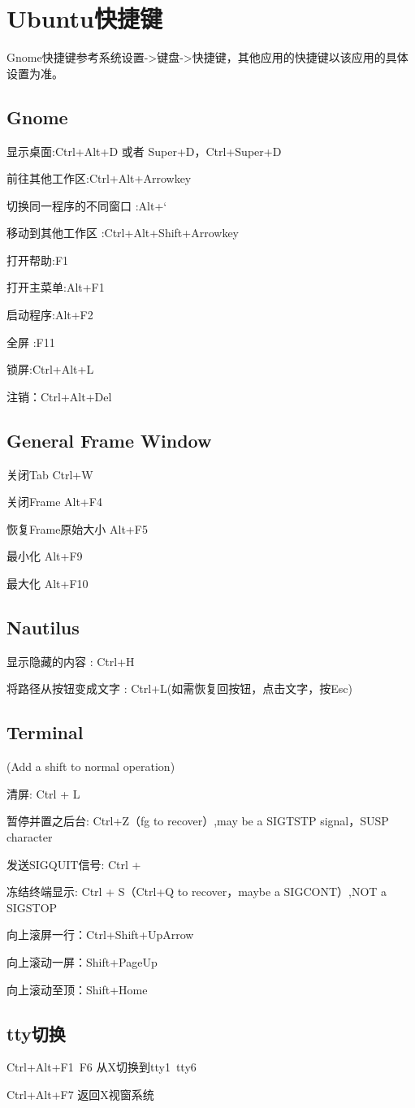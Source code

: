 \section{Ubuntu快捷键}

Gnome快捷键参考系统设置->键盘->快捷键，其他应用的快捷键以该应用的具体设置为准。

\subsection{Gnome}

显示桌面:Ctrl+Alt+D 或者 Super+D，Ctrl+Super+D

前往其他工作区:Ctrl+Alt+Arrowkey

切换同一程序的不同窗口 :Alt+`

移动到其他工作区 :Ctrl+Alt+Shift+Arrowkey

打开帮助:F1

打开主菜单:Alt+F1

启动程序:Alt+F2

全屏 :F11

锁屏:Ctrl+Alt+L

注销：Ctrl+Alt+Del

\subsection{General Frame Window}

关闭Tab Ctrl+W

关闭Frame Alt+F4

恢复Frame原始大小  Alt+F5

最小化 Alt+F9

最大化 Alt+F10

\subsection{Nautilus}

显示隐藏的内容 : Ctrl+H

将路径从按钮变成文字 :  Ctrl+L(如需恢复回按钮，点击文字，按Esc)


\subsection{Terminal}

(Add a shift to normal operation)

清屏: Ctrl + L

暂停并置之后台: Ctrl+Z（fg to recover）,may be a SIGTSTP signal，SUSP character

发送SIGQUIT信号: Ctrl + \

冻结终端显示: Ctrl + S（Ctrl+Q to recover，maybe a SIGCONT）,NOT a SIGSTOP

向上滚屏一行：Ctrl+Shift+UpArrow

向上滚动一屏：Shift+PageUp

向上滚动至顶：Shift+Home


\subsection{tty切换}
Ctrl+Alt+F1~F6 从X切换到tty1~tty6

Ctrl+Alt+F7 返回X视窗系统











